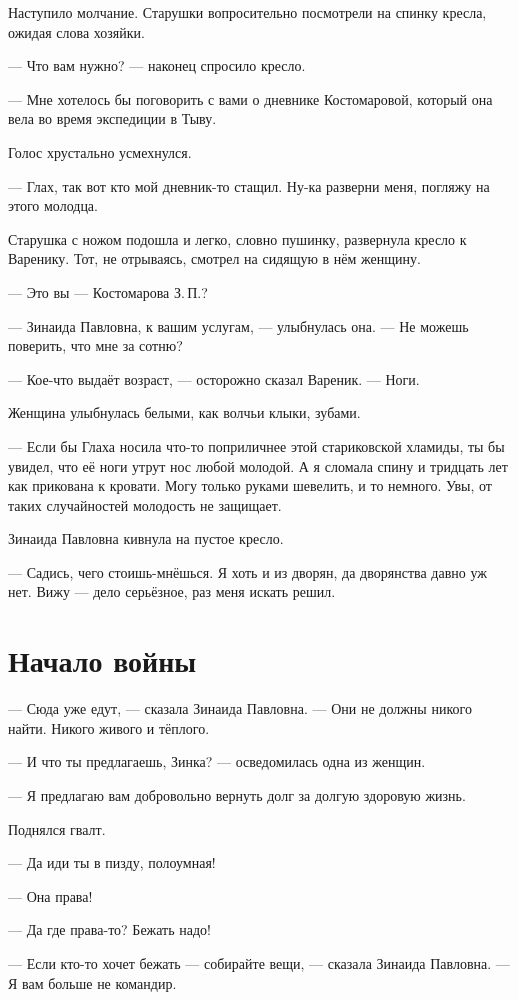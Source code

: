 \documentclass[a4paper,10pt,fleqn]{book}\usepackage{polyglossia}\setdefaultlanguage{english}\setotherlanguage{russian}\defaultfontfeatures{Ligatures=TeX,Mapping=tex-text} \usepackage{xcolor}\definecolor{lightgray}{HTML}{bbbbbb}\color{lightgray}\newcommand{\ml}[3]{\textcolor{black}{#3}}
\begin{document}
Наступило молчание.
Старушки вопросительно посмотрели на спинку кресла, ожидая слова хозяйки.

--- Что вам нужно? --- наконец спросило кресло.

--- Мне хотелось бы поговорить с вами о дневнике Костомаровой, который она вела во время экспедиции в Тыву.

Голос хрустально усмехнулся.

--- Глах, так вот кто мой дневник-то стащил.
Ну-ка разверни меня, погляжу на этого молодца.

Старушка с ножом подошла и легко, словно пушинку, развернула кресло к Варенику.
Тот, не отрываясь, смотрел на сидящую в нём женщину.

--- Это вы --- Костомарова З.\,П.?

--- Зинаида Павловна, к вашим услугам, --- улыбнулась она.
--- Не можешь поверить, что мне за сотню?

--- Кое-что выдаёт возраст, --- осторожно сказал Вареник.
--- Ноги.

Женщина улыбнулась белыми, как волчьи клыки, зубами.

--- Если бы Глаха носила что-то поприличнее этой стариковской хламиды, ты бы увидел, что её ноги утрут нос любой молодой.
А я сломала спину и тридцать лет как прикована к кровати.
Могу только руками шевелить, и то немного.
Увы, от таких случайностей молодость не защищает.

Зинаида Павловна кивнула на пустое кресло.

--- Садись, чего стоишь-мнёшься.
Я хоть и из дворян, да дворянства давно уж нет.
Вижу --- дело серьёзное, раз меня искать решил.

\section{Начало войны}

--- Сюда уже едут, --- сказала Зинаида Павловна.
--- Они не должны никого найти.
Никого живого и тёплого.

--- И что ты предлагаешь, Зинка? --- осведомилась одна из женщин.

--- Я предлагаю вам добровольно вернуть долг за долгую здоровую жизнь.

Поднялся гвалт.

--- Да иди ты в пизду, полоумная!

--- Она права!

--- Да где права-то?
Бежать надо!

--- Если кто-то хочет бежать --- собирайте вещи, --- сказала Зинаида Павловна.
--- Я вам больше не командир.
\end{document}
